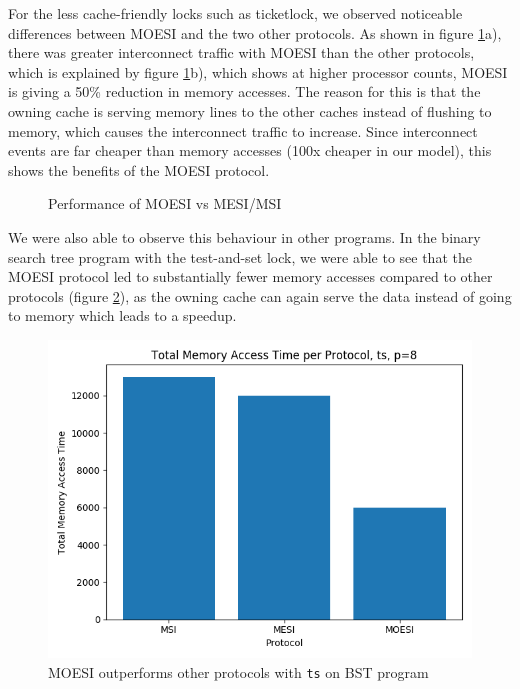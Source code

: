 \documentclass{article}
\def\inline{\lstinline[language=C++, basicstyle=\ttfamily]}
\begin{document}
For the less cache-friendly locks such as ticketlock, we observed noticeable differences between MOESI and the two other protocols.  As shown in figure \ref{fig:moesi}a), there was greater interconnect traffic with MOESI than the other protocols, which is explained by figure \ref{fig:moesi}b), which shows at higher processor counts, MOESI is giving a 50\% reduction in memory accesses.  The reason for this is that the owning cache is serving memory lines to the other caches instead of flushing to memory, which causes the interconnect traffic to increase. Since interconnect events are far cheaper than memory accesses (100x cheaper in our model), this shows the benefits of the MOESI protocol.

\begin{figure}[H]%
    \centering
    \qquad
    \caption{Performance of MOESI vs MESI/MSI}
    \label{fig:moesi}
\end{figure}

We were also able to observe this behaviour in other programs.  In the binary search tree program with the test-and-set lock, we were able to see that the MOESI protocol led to substantially fewer memory accesses compared to other protocols (figure \ref{fig:bst}), as the owning cache can again serve the data instead of going to memory which leads to a speedup.

\begin{figure}[h]
\centering
\includegraphics[width=.5\textwidth]{figures/bst_ts_mem_time.png}
\caption{MOESI outperforms other protocols with \inline{ts} on BST program}
\label{fig:bst}
\end{figure}
\end{document}
